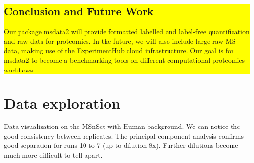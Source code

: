 \documentclass{article}
\newcommand{\hcode}[2][lgray]{{\ttfamily\color{vdgray}\colorbox{#1}{#2}}}
\begin{document}
\begin{multicols}{2}
\vspace{.4cm}
\noindent
\colorbox{yellow}{
  \begin{minipage}[t]{0.965\linewidth}
    \vspace{.15cm}
    \section*{\huge Conclusion and Future Work}
    \large Our package \hcode{msdata2} will provide formatted labelled
    and label-free quantification and raw data for proteomics.  In the
    future, we will also include large raw MS data, making use of the
    ExperimentHub cloud infrastructure. Our goal is for
    \hcode{msdata2} to become a benchmarking tools on different
    computational proteomics workflows.

  \end{minipage}
}


\noindent
\begin{minipage}[h]{1\linewidth}
  \vspace{1cm}

  \section*{Data exploration}
  \large

  Data visualization on the \hcode{MSnSet} with Human background. We
  can notice the good consistency between replicates. The principal
  component analysis confirms good separation for runs 10 to 7 (up to
  dilution 8x). Further dilutions become much more difficult to tell
  apart.

\end{minipage}


\end{multicols}
\end{document}
